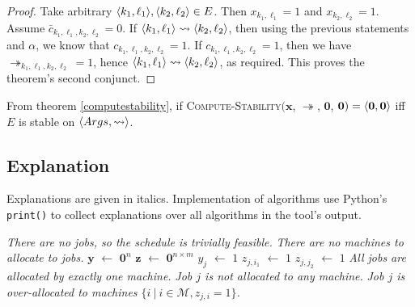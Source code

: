 \begin{theorem}
\begin{proof}
		\linespace
		Take arbitrary $\langle{k_1},{\ell_1}\rangle,\langle{k_2},{\ell_2}\rangle\in E$. Then $x_{k_1,\ell_1}=1$ and $x_{k_2,\ell_2}=1$. Assume $\bar{c}_{k_1,\ell_1,k_2,\ell_2}=0$. If $\langle{k_1},{\ell_1}\rangle\rightsquigarrow\langle{k_2},{\ell_2}\rangle$, then using the previous statements and $\alpha$, we know that $c_{k_1,\ell_1,k_2,\ell_2}=1$. If $c_{k_1,\ell_1,k_2,\ell_2}=1$, then we have $\twoheadrightarrow_{k_1,\ell_1,k_2,\ell_2}=1$, hence $\langle{k_1},{\ell_1}\rangle\rightsquigarrow\langle{k_2},{\ell_2}\rangle$, as required. This proves the theorem's second conjunct.
	\end{proof}

\end{theorem}

From theorem \ref{computestability}, if \textsc{Compute-Stability}$(\mathbf{x}$, $\twoheadrightarrow$, $\mathbf{0}$, $\mathbf{0})=\langle{\mathbf{0}},{\mathbf{0}}\rangle$ iff $E$ is stable on $\langle{Args},{\rightsquigarrow}\rangle$.

\subsection{Explanation}

Explanations are given in italics. Implementation of algorithms use Python's \verb|print()| to collect explanations over all algorithms in the tool's output.

\begin{algorithm}[H]
	\caption{}
	\begin{algorithmic}[1]
					\State \emph{There are no jobs, so the schedule is trivially feasible.}
				\Else
					\State \emph{There are no machines to allocate to jobs.}
				\EndIf
			\Else
				\State $\mathbf{y}$ $\gets$ $\mathbf{0}^n$
				\State $\mathbf{z}$ $\gets$ $\mathbf{0}^{n\times m}$
								\State $y_j$ $\gets$ $1$
								\State $z_{j,i_1}$ $\gets$ $1$
								\State $z_{j,j_2}$ $\gets$ $1$
							\EndIf
						\EndFor
					\EndFor					
				\EndFor
					\State \emph{All jobs are allocated by exactly one machine.}
				\Else
							\State \emph{Job $j$ is not allocated to any machine.}
						\EndIf
							\State \emph{Job $j$ is over-allocated to machines $\{i\ |\ i\in\mathcal{M}, z_{j,i}=1\}$.}
						\EndIf
					\EndFor
				\EndIf
			\EndIf
		\EndFunction
	\end{algorithmic}
\end{algorithm}

